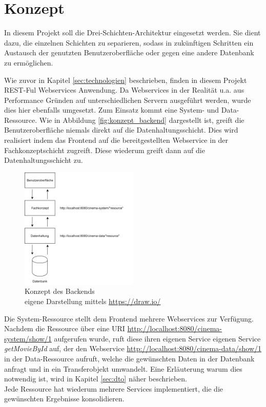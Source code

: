 \section{Konzept}
\label{sec:konzept}
In diesem Projekt soll die Drei-Schichten-Architektur eingesetzt werden. Sie dient dazu, die einzelnen Schichten zu separieren, sodass in zukünftigen Schritten ein Austausch der genutzten Benutzeroberfläche oder gegen eine andere Datenbank zu ermöglichen. 

Wie zuvor in Kapitel \vref{sec:technologien} beschrieben, finden in diesem Projekt REST-Ful Webservices Anwendung. Da Webservices in der Realität u.a. aus Performance Gründen auf unterschiedlichen Servern ausgeführt werden, wurde dies hier ebenfalls umgesetzt. Zum Einsatz kommt eine System- und Data-Ressource. Wie in Abbildung \vref{fig:konzept_backend} dargestellt ist, greift die Benutzeroberfläche niemals direkt auf die Datenhaltungsschicht. Dies wird realisiert indem das Frontend auf die bereitgestellten Webservice in der Fachkonzeptschicht zugreift. Diese wiederum greift dann auf die Datenhaltungsschicht zu.   

\begin{figure}[ht]
	\centering
	\includegraphics[width=0.5\textwidth]{img/backend/drei-schichten-architektur}
	\captionsetup{format=hang}
	\caption{Konzept des Backends \\
		eigene Darstellung mittels \url{https://draw.io/}}
		\label{fig:konzept_backend}
	\end{figure}

Die System-Ressource stellt dem Frontend mehrere Webservices zur Verfügung. Nachdem die Ressource über eine \ac{URI} \url{http://localhost:8080/cinema-system/show/1} aufgerufen wurde, ruft diese ihren eigenen Service eigenen Service \textit{getMovieById} auf, der den Webservice \url{http://localhost:8080/cinema-data/show/1} in der Data-Ressource aufruft, welche die gewünschten Daten in der Datenbank anfragt und in ein Transferobjekt umwandelt. Eine Erläuterung warum dies notwendig ist, wird in Kapitel \vref{sec:dto} näher beschrieben. \\
Jede Ressource hat wiederum mehrere Services implementiert, die die gewünschten Ergebnisse konsolidieren.  

